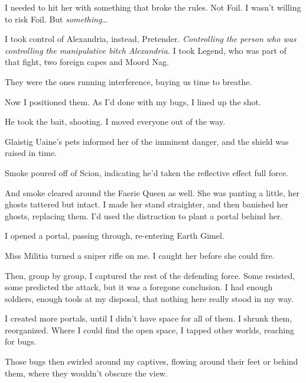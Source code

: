 I needed to hit her with something that broke the rules.  Not Foil.  I wasn't willing to risk Foil.  But \emph{something}\ldots



I took control of Alexandria, instead, Pretender.  \emph{Controlling the person who was controlling the manipulative bitch Alexandria.}  I took Legend, who was part of that fight, two foreign capes and Moord Nag.



They were the ones running interference, buying us time to breathe.



Now I positioned them.  As I'd done with my bugs, I lined up the shot.



He took the bait, shooting.  I moved everyone out of the way.



Glaistig Uaine's pets informed her of the imminent danger, and the shield was raised in time.



Smoke poured off of Scion, indicating he'd taken the reflective effect full force.



And smoke cleared around the Faerie Queen as well.  She was panting a little, her ghosts tattered but intact.  I made her stand straighter, and then banished her ghosts, replacing them.  I'd used the distraction to plant a portal behind her.



I opened a portal, passing through, re-entering Earth Gimel.



Miss Militia turned a sniper rifle on me.  I caught her before she could fire.



Then, group by group, I captured the rest of the defending force.  Some resisted, some predicted the attack, but it was a foregone conclusion.  I had enough soldiers, enough tools at my disposal, that nothing here really stood in my way.



I created more portals, until I didn't have space for all of them.  I shrunk them, reorganized.  Where I could find the open space, I tapped other worlds, reaching for bugs.



Those bugs then swirled around my captives, flowing around their feet or behind them, where they wouldn't obscure the view.



